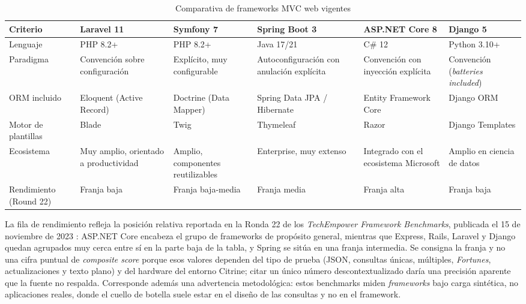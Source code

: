 \documentclass[12pt,a4paper]{article}
\begin{document}
\begin{table}[h!]
  \centering
  \caption{Comparativa de frameworks MVC web vigentes}
  \label{tab:frameworks}
  \begin{tabularx}{\linewidth}{@{}L{2.1cm}L{2.4cm}L{2.2cm}L{2.2cm}L{2.4cm}L{2.2cm}@{}}
    \toprule
    \textbf{Criterio} & \textbf{Laravel 11} & \textbf{Symfony 7} & \textbf{Spring Boot 3} &
    \textbf{ASP.NET Core 8} & \textbf{Django 5} \\
    \midrule
    Lenguaje & PHP 8.2+ & PHP 8.2+ & Java 17/21 & C\# 12 & Python 3.10+ \\[3pt]
    Paradigma & Convención sobre configuración & Explícito, muy configurable &
      Autoconfiguración con anulación explícita & Convención con inyección explícita &
      Convención (\textit{batteries included}) \\[3pt]
    ORM incluido & Eloquent (Active Record) & Doctrine (Data Mapper) &
      Spring Data JPA / Hibernate & Entity Framework Core & Django ORM \\[3pt]
    Motor de plantillas & Blade & Twig & Thymeleaf & Razor & Django Templates \\[3pt]
    Ecosistema & Muy amplio, orientado a productividad & Amplio, componentes reutilizables &
      Enterprise, muy extenso & Integrado con el ecosistema Microsoft &
      Amplio en ciencia de datos \\[3pt]
    Rendimiento (Round 22) & Franja baja & Franja baja-media & Franja media &
      Franja alta & Franja baja \\
    \bottomrule
  \end{tabularx}
\end{table}

La fila de rendimiento refleja la posición relativa reportada en la Ronda 22 de los
\textit{TechEmpower Framework Benchmarks}, publicada el 15 de noviembre de 2023
\parencite{techempower2023}: ASP.NET Core encabeza el grupo de frameworks de propósito general,
mientras que Express, Rails, Laravel y Django quedan agrupados muy cerca entre sí en la parte
baja de la tabla, y Spring se sitúa en una franja intermedia. Se consigna la franja y no una cifra
puntual de \textit{composite score} porque esos valores dependen del tipo de prueba (JSON,
consultas únicas, múltiples, \textit{Fortunes}, actualizaciones y texto plano) y del hardware del
entorno Citrine; citar un único número descontextualizado daría una precisión aparente que la
fuente no respalda. Corresponde además una advertencia metodológica: estos benchmarks miden
\textit{frameworks} bajo carga sintética, no aplicaciones reales, donde el cuello de botella
suele estar en el diseño de las consultas y no en el framework.
\end{document}
